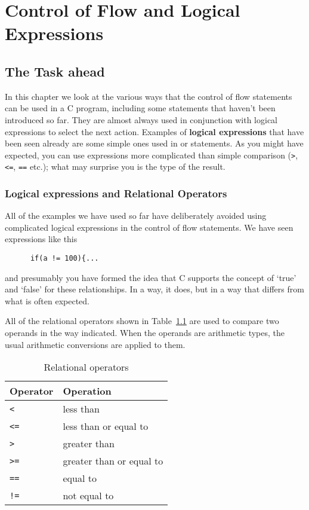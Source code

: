 \chapter{Control of Flow and Logical Expressions}


        \section{The Task ahead}
        

  

  In this chapter we look at the various ways that the control of flow
   statements can be used in a C program, including some statements that
   haven't been introduced so far. They are almost always used in conjunction
   with logical expressions to select the next action. Examples of
   \textbf{logical expressions} that have been seen already are some simple
   ones used in \kif{} or \while{} statements. As you might
   have expected, you can use expressions more complicated than simple
   comparison (\texttt{>}, \texttt{<=}, \texttt{==} etc.);
   what may surprise you is the type of the result.


  \subsection{Logical expressions and Relational Operators}
   

   All of the examples we have used so far have deliberately avoided using
    complicated logical expressions in the control of flow statements. We have
    seen expressions like this


    \begin{Verbatim}
      if(a != 100){...
      \end{Verbatim}

   and presumably you have formed the idea that C supports the concept
    of `true' and `false' for these relationships. In a way, it
    does, but in a way that differs from what is often expected.


   All of the relational operators shown in Table~\ref{tabrelOp} are used
    to compare two operands in the way indicated. When the operands are
    arithmetic types, the usual arithmetic conversions are applied to
    them.


    \begin{table}[htb]
      \centering
      \begin{tabular}{ll}
        \toprule
        Operator    & Operation    \\
        \midrule
        \texttt{<}  & less than    \\
        \texttt{<=} & less than or equal to    \\
        \texttt{>}  & greater than    \\
        \texttt{>=} & greater than or equal to    \\
        \texttt{==} & equal to    \\
        \texttt{!=} & not equal to    \\
        \bottomrule
      \end{tabular}
      \caption{\label{tabrelOp}Relational operators}
    \end{table}


